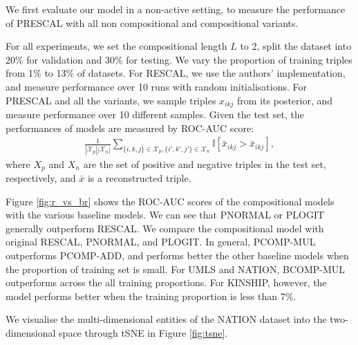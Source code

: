 We first evaluate our model in a non-active setting, 
to measure the performance of PRESCAL with all non compositional and compositional variants.

For all experiments, we set the compositional length $L$ to 2, split the dataset into 20\% for validation and 30\% for testing. We vary the proportion of training triples
from 1\% to 13\% of datasets. For RESCAL, we use the authors' implementation, and measure performance over 10 runs with random initialisations. For PRESCAL and all the variants, we sample triples $x_{ikj}$ from its posterior, and measure performance over 10 different samples.
Given the test set, the performances of models are measured by ROC-AUC score:
\begin{align}
\frac{1}{|\mathcal{X}_p|  |\mathcal{X}_n|} \sum_{\{i,k,j\} \in \mathcal{X}_p, \{i',k',j'\} \in \mathcal{X}_n} \mathbb{I}[\bar{x}_{ikj} > \bar{x}_{ikj}],
\end{align}
where $X_p$ and $X_n$ are the set of positive and negative triples in the test set, respectively, and $\bar{x}$ is a reconstructed triple.

Figure \ref{fig:r_vs_br} shows the ROC-AUC scores of the compositional models with the various baseline models. We can see that PNORMAL or PLOGIT generally outperform RESCAL. We compare the compositional model with original RESCAL, PNORMAL, and PLOGIT. In general, PCOMP-MUL outperforms PCOMP-ADD, and performs better the other baseline models when the proportion of training set is small. For UMLS and NATION, BCOMP-MUL outperforms across the all training proportions. For KINSHIP, however, the model performs better when the training proportion is less than 7\%.

We visualise the multi-dimensional entities of the NATION dataset into the two-dimensional space through tSNE \cite{VanDerMaaten2008} in Figure \ref{fig:tsne}. 

